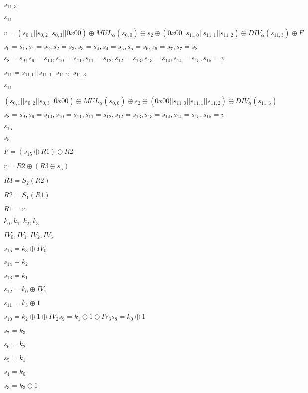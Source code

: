 \documentclass{article}
\begin{document}
$ s_{11,3}$
\pagebreak

$ s_{11}$
\pagebreak

$ v = (s_{0,1} || s_{0,2} || s_{0,3} || 0x00) \oplus MUL_α(s_{0,0}) \oplus s_2 \oplus (0x00 || s_{11,0} || s_{11,1} || s_{11,2}) \oplus DIV_α(s_{11,3}) \oplus F$
\pagebreak

$ s_0=s_1, s_1=s_2, s_2=s_3, s_3=s_4, s_4=s_5, s_5=s_6, s_6=s_7, s_7=s_8$
\pagebreak

$ s_8=s_9, s_9=s_{10}, s_{10}=s_{11}, s_{11}=s_{12}, s_{12}=s_{13}, s_{13}=s_{14}, s_{14}=s_{15}, s_{15} = v$
\pagebreak

$ s_11 = s_{11,0} || s_{11,1} || s_{11,2} || s_{11,3}$
\pagebreak

$ s_11$
\pagebreak

$ (s_{0,1} || s_{0,2} || s_{0,3} || 0x00) \oplus MUL_α(s_{0,0}) \oplus s_2 \oplus (0x00 || s_{11,0} || s_{11,1} || s_{11,2}) \oplus DIV_α(s_{11,3})$
\pagebreak

$ s_8=s_9, s_9=s_{10}, s_{10}=s_{11}, s_{11}=s_{12}, s_{12}=s_{13}, s_{13}=s_{14}, s_{14}=s_{15}, s_{15}=v$
\pagebreak

$ s_{15}$
\pagebreak

$ s_5$
\pagebreak

$ F = (s_{15} \oplus R1) \oplus R2$
\pagebreak

$ r = R2 \oplus (R3 \oplus s_5)$
\pagebreak

$ R3 = S_2(R2)$
\pagebreak

$ R2 = S_1(R1)$
\pagebreak

$ R1 = r$
\pagebreak

$ k_0, k_1, k_2, k_3$
\pagebreak

$ IV_0, IV_1, IV_2, IV_3$
\pagebreak

$ s_{15}=k_3 \oplus IV_0$
\pagebreak

$ s_{14}=k_2$
\pagebreak

$ s_{13}=k_1$
\pagebreak

$ s_{12}=k_0 \oplus IV_1$
\pagebreak

$ s_{11}=k_3 \oplus 1$
\pagebreak

$ s_{10}=k_2 \oplus 1 \oplus IV_2 s_9 = k_1 \oplus 1 \oplus IV_3 s_8 = k_0 \oplus 1$
\pagebreak

$ s_7=k_3$
\pagebreak

$ s_6=k_2$
\pagebreak

$ s_5=k_1$
\pagebreak

$ s_4=k_0$
\pagebreak

$ s_3=k_3 \oplus 1$
\pagebreak
\end{document}
